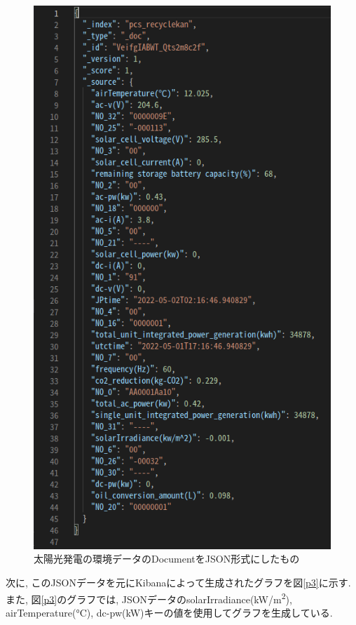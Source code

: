 \documentclass[a4j,12pt,]{jarticle}
\begin{document}
\begin{figure}[H]
  \begin{center}
    \includegraphics[width=130mm]{one_json.png}
    \caption{太陽光発電の環境データのDocumentをJSON形式にしたもの}
    \label{p2}
  \end{center}
\end{figure}

次に, このJSONデータを元にKibanaによって生成されたグラフを図\ref{p3}に示す.
また, 図\ref{p3}のグラフでは, JSONデータのsolarIrradiance(\si{\kilo\watt}/\si{\metre\squared}), airTemperature(\si{\degreeCelsius}), dc-pw(\si{\kilo\watt})キーの値を使用してグラフを生成している.
\end{document}
